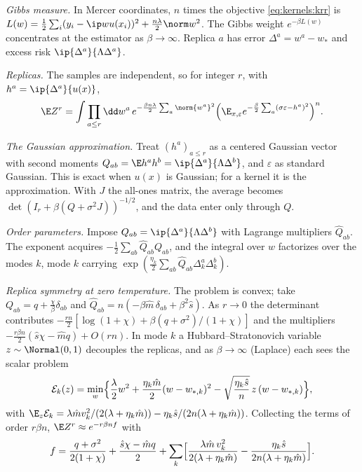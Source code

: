 \begin{refsection}
\begin{heuristic}
\emph{Gibbs measure.} In Mercer coordinates, $n$ times the objective \eqref{eq:kernels:krr} is $L(w)=\frac12\sum_i(y_i-\ip w{u(x_i)})^2+\frac{n\lambda}2\norm w^2$. The Gibbs weight $e^{-\beta L(w)}$ concentrates at the estimator as $\beta\to\infty$. Replica $a$ has error $\Delta^a=w^a-w_*$ and excess risk $\ip{\Delta^a}{\Lambda\Delta^a}$.

\emph{Replicas.} The samples are independent, so for integer $r$, with $h^a=\ip{\Delta^a}{u(x)}$,
\[
\E Z^r=\int\prod_{a\le r}\dd w^a\,e^{-\frac{\beta n\lambda}2\sum_a\norm{w^a}^2}\Bigl(\E_{x,\varepsilon}e^{-\frac\beta2\sum_a(\sigma\varepsilon-h^a)^2}\Bigr)^n .
\]

\emph{The Gaussian approximation.} Treat $(h^a)_{a\le r}$ as a centered Gaussian vector with second moments $Q_{ab}=\E h^ah^b=\ip{\Delta^a}{\Lambda\Delta^b}$, and $\varepsilon$ as standard Gaussian. This is exact when $u(x)$ is Gaussian; for a kernel it is the approximation. With $J$ the all-ones matrix, the average becomes $\det(I_r+\beta(Q+\sigma^2J))^{-1/2}$, and the data enter only through $Q$.

\emph{Order parameters.} Impose $Q_{ab}=\ip{\Delta^a}{\Lambda\Delta^b}$ with Lagrange multipliers $\hat Q_{ab}$. The exponent acquires $-\frac12\sum_{ab}\hat Q_{ab}Q_{ab}$, and the integral over $w$ factorizes over the modes $k$, mode $k$ carrying $\exp(\frac{\eta_k}2\sum_{ab}\hat Q_{ab}\Delta^a_k\Delta^b_k)$.

\emph{Replica symmetry at zero temperature.} The problem is convex; take $Q_{ab}=q+\frac\chi\beta\delta_{ab}$ and $\hat Q_{ab}=n(-\beta\hat m\,\delta_{ab}+\beta^2\hat s)$. As $r\to0$ the determinant contributes $-\frac{rn}2[\log(1+\chi)+\beta(q+\sigma^2)/(1+\chi)]$ and the multipliers $-\frac{r\beta n}2(\hat s\chi-\hat mq)+O(rn)$. In mode $k$ a Hubbard--Stratonovich variable $z\sim\Normal(0,1)$ decouples the replicas, and as $\beta\to\infty$ (Laplace) each sees the scalar problem
\[
\mathcal E_k(z)=\min_w\Bigl\{\frac\lambda2w^2+\frac{\eta_k\hat m}2(w-w_{*,k})^2-\sqrt{\frac{\eta_k\hat s}n}\,z\,(w-w_{*,k})\Bigr\},
\]
with $\E_z\mathcal E_k=\lambda\hat mv_k^2/(2(\lambda+\eta_k\hat m))-\eta_k\hat s/(2n(\lambda+\eta_k\hat m))$. Collecting the terms of order $r\beta n$, $\E Z^r\approx e^{-r\beta nf}$ with
\[
f=\frac{q+\sigma^2}{2(1+\chi)}+\frac{\hat s\chi-\hat mq}2+\sum_k\Bigl[\frac{\lambda\hat m\,v_k^2}{2(\lambda+\eta_k\hat m)}-\frac{\eta_k\hat s}{2n(\lambda+\eta_k\hat m)}\Bigr].
\]


\end{heuristic}
\end{refsection}
